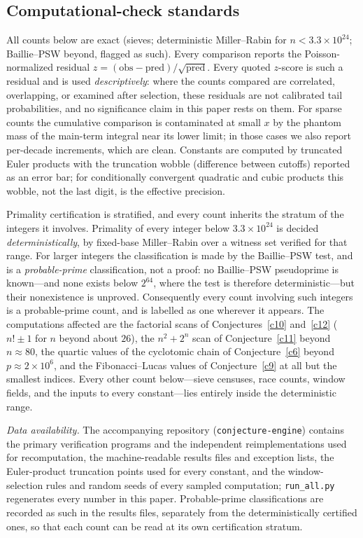 \documentclass[11pt]{article}
\theoremstyle{definition}
\begin{document}
\subsection*{Computational-check standards}

All counts below are exact (sieves; deterministic Miller--Rabin for
$n<3.3\times10^{24}$; Baillie--PSW beyond, flagged as such).  Every
comparison reports the Poisson-normalized residual
$z=(\mathrm{obs}-\mathrm{pred})/\sqrt{\mathrm{pred}}$.  Every quoted
$z$-score is such a residual and is used \emph{descriptively}: where
the counts compared are correlated, overlapping, or examined after
selection, these residuals are not calibrated tail probabilities, and
no significance claim in this paper rests on them.  For sparse
counts the cumulative comparison is contaminated at small $x$ by the
phantom mass of the main-term integral near its lower limit; in those
cases we also report per-decade increments, which are clean.  Constants
are computed by truncated Euler products with the truncation wobble
(difference between cutoffs) reported as an error bar; for conditionally
convergent quadratic and cubic products this wobble, not the last digit,
is the effective precision.

Primality certification is stratified, and every count inherits the
stratum of the integers it involves.  Primality of every integer below
$3.3\times10^{24}$ is decided \emph{deterministically}, by fixed-base
Miller--Rabin over a witness set verified for that range.  For larger
integers the classification is made by the Baillie--PSW test, and is a
\emph{probable-prime} classification, not a proof: no Baillie--PSW
pseudoprime is known---and none exists below $2^{64}$, where the test
is therefore deterministic---but their nonexistence is unproved.
Consequently every count involving such integers is a probable-prime
count, and is labelled as one wherever it appears.  The computations
affected are the factorial scans of Conjectures~\ref{c10}
and~\ref{c12} ($n!\pm1$ for $n$ beyond about $26$), the $n^2+2^n$ scan
of Conjecture~\ref{c11} beyond $n\approx80$, the quartic values of the
cyclotomic chain of Conjecture~\ref{c6} beyond $p\approx2\times10^6$,
and the Fibonacci--Lucas values of Conjecture~\ref{c9} at all but the
smallest indices.  Every other count below---sieve censuses, race
counts, window fields, and the inputs to every constant---lies
entirely inside the deterministic range.

\emph{Data availability.}  The accompanying repository
(\texttt{conjecture-engine}) contains the primary verification
programs and the independent reimplementations used for
recomputation, the machine-readable results files and exception
lists, the Euler-product truncation points used for every constant,
and the window-selection rules and random seeds of every sampled
computation; \texttt{run\_all.py} regenerates every number in this
paper.  Probable-prime classifications are recorded as such in the
results files, separately from the deterministically certified ones,
so that each count can be read at its own certification stratum.
\end{document}
